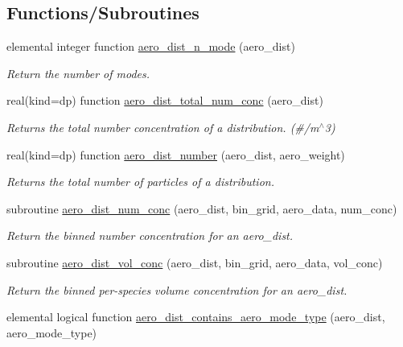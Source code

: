 \subsection*{Functions/\+Subroutines}
\begin{DoxyCompactItemize}
\item 
elemental integer function \mbox{\hyperlink{namespacepmc__aero__dist_a2a730d12e3dc3d0c51d7aff80bd30e35}{aero\+\_\+dist\+\_\+n\+\_\+mode}} (aero\+\_\+dist)
\begin{DoxyCompactList}\small\item\em Return the number of modes. \end{DoxyCompactList}\item 
real(kind=dp) function \mbox{\hyperlink{namespacepmc__aero__dist_a1976c9bd301379b91f6c14668315bacf}{aero\+\_\+dist\+\_\+total\+\_\+num\+\_\+conc}} (aero\+\_\+dist)
\begin{DoxyCompactList}\small\item\em Returns the total number concentration of a distribution. (\#/m$^\wedge$3) \end{DoxyCompactList}\item 
real(kind=dp) function \mbox{\hyperlink{namespacepmc__aero__dist_abc6bb98e0bbd18394c4c9f146d0337f0}{aero\+\_\+dist\+\_\+number}} (aero\+\_\+dist, aero\+\_\+weight)
\begin{DoxyCompactList}\small\item\em Returns the total number of particles of a distribution. \end{DoxyCompactList}\item 
subroutine \mbox{\hyperlink{namespacepmc__aero__dist_a59a20aa0065ae63e35a55c8079ce9d66}{aero\+\_\+dist\+\_\+num\+\_\+conc}} (aero\+\_\+dist, bin\+\_\+grid, aero\+\_\+data, num\+\_\+conc)
\begin{DoxyCompactList}\small\item\em Return the binned number concentration for an aero\+\_\+dist. \end{DoxyCompactList}\item 
subroutine \mbox{\hyperlink{namespacepmc__aero__dist_a876b60eece43d39ab4d5c09a5a5d22d7}{aero\+\_\+dist\+\_\+vol\+\_\+conc}} (aero\+\_\+dist, bin\+\_\+grid, aero\+\_\+data, vol\+\_\+conc)
\begin{DoxyCompactList}\small\item\em Return the binned per-\/species volume concentration for an aero\+\_\+dist. \end{DoxyCompactList}\item 
elemental logical function \mbox{\hyperlink{namespacepmc__aero__dist_acb52a306c5fd713a1a76f66ef21b22d9}{aero\+\_\+dist\+\_\+contains\+\_\+aero\+\_\+mode\+\_\+type}} (aero\+\_\+dist, aero\+\_\+mode\+\_\+type)

\end{DoxyCompactItemize}
